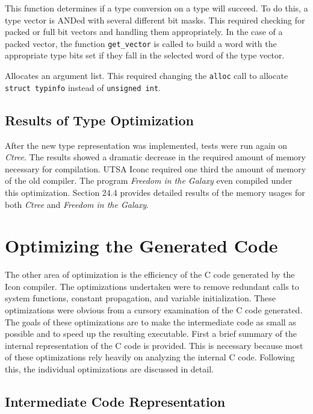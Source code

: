 
This function determines if a type conversion on a type will
succeed. To do this, a type vector is ANDed with several different bit
masks. This required checking for packed or full bit vectors and
handling them appropriately. In the case of a packed vector, the
function \texttt{get\_vector} is called to build a word with the
appropriate type bits set if they fall in the selected word of the
type vector.


Allocates an argument list. This required changing the
\texttt{alloc} call to allocate \texttt{struct typinfo} instead of
\texttt{unsigned int}.

\subsection{Results of Type Optimization}

After the new type representation was implemented, tests were run
again on \textit{Ctree}. The results showed a dramatic decrease in the
required amount of memory necessary for compilation. UTSA Iconc
required one third the amount of memory of the old compiler. The
program \textit{Freedom in the Galaxy} even compiled under this
optimization. Section 24.4 provides detailed results of the memory
usages for both \textit{Ctree} and \textit{Freedom in the Galaxy}.

\section{Optimizing the Generated Code}

The other area of optimization is the efficiency of the C code
generated by the Icon compiler. The optimizations undertaken were to
remove redundant calls to system functions, constant propagation, and
variable initialization. These optimizations were obvious from a
cursory examination of the C code generated. The goals of these
optimizations are to make the intermediate code as small as possible
and to speed up the resulting executable. First a brief summary of
the internal representation of the C code is provided. This is
necessary because most of these optimizations rely heavily on
analyzing the internal C code. Following this, the individual
optimizations are discussed in detail.

\subsection{Intermediate Code Representation}

